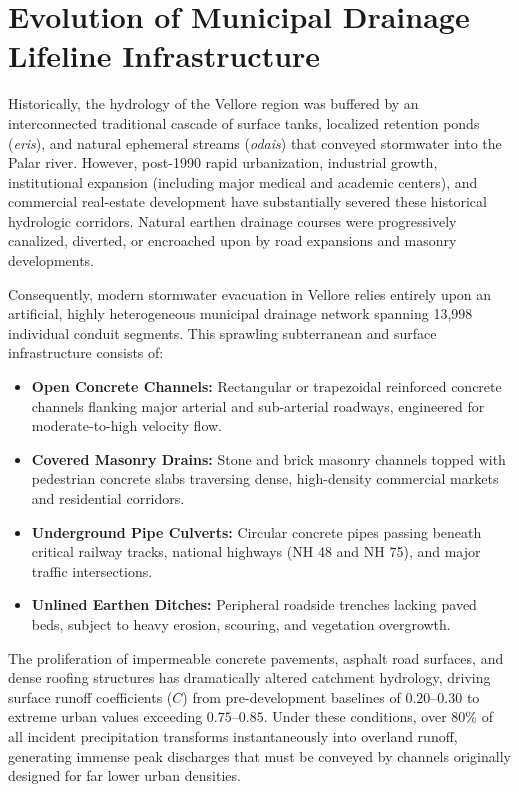 \section{Evolution of Municipal Drainage Lifeline Infrastructure}
Historically, the hydrology of the Vellore region was buffered by an interconnected traditional cascade of surface tanks, localized retention ponds (\textit{eris}), and natural ephemeral streams (\textit{odais}) that conveyed stormwater into the Palar river. However, post-1990 rapid urbanization, industrial growth, institutional expansion (including major medical and academic centers), and commercial real-estate development have substantially severed these historical hydrologic corridors. Natural earthen drainage courses were progressively canalized, diverted, or encroached upon by road expansions and masonry developments.

Consequently, modern stormwater evacuation in Vellore relies entirely upon an artificial, highly heterogeneous municipal drainage network spanning 13,998 individual conduit segments. This sprawling subterranean and surface infrastructure consists of:
\begin{itemize}
    \item \textbf{Open Concrete Channels:} Rectangular or trapezoidal reinforced concrete channels flanking major arterial and sub-arterial roadways, engineered for moderate-to-high velocity flow.
    \item \textbf{Covered Masonry Drains:} Stone and brick masonry channels topped with pedestrian concrete slabs traversing dense, high-density commercial markets and residential corridors.
    \item \textbf{Underground Pipe Culverts:} Circular concrete pipes passing beneath critical railway tracks, national highways (NH 48 and NH 75), and major traffic intersections.
    \item \textbf{Unlined Earthen Ditches:} Peripheral roadside trenches lacking paved beds, subject to heavy erosion, scouring, and vegetation overgrowth.
\end{itemize}

The proliferation of impermeable concrete pavements, asphalt road surfaces, and dense roofing structures has dramatically altered catchment hydrology, driving surface runoff coefficients ($C$) from pre-development baselines of $0.20\text{--}0.30$ to extreme urban values exceeding $0.75\text{--}0.85$. Under these conditions, over 80\% of all incident precipitation transforms instantaneously into overland runoff, generating immense peak discharges that must be conveyed by channels originally designed for far lower urban densities.

